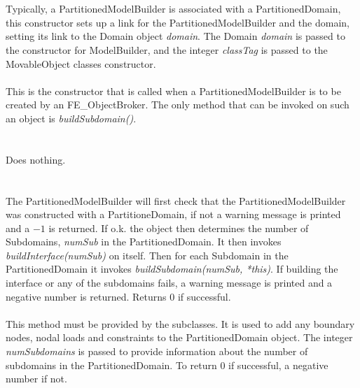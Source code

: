  \\ 
\\  
Typically, a PartitionedModelBuilder is associated with a PartitionedDomain,
this constructor sets up a link for the PartitionedModelBuilder and the domain,
setting its link to the Domain object {\em domain}. The Domain {\em
domain} is passed to the constructor for ModelBuilder, and the integer
{\em classTag} is passed to the MovableObject classes constructor. \\

\\  
This is the constructor that is called when a PartitionedModelBuilder
is to be created by an FE\_ObjectBroker. The only method that can be
invoked on such an object is {\em buildSubdomain()}. \\

 \\
\\ 
Does nothing. \\


 \\
 \\
The PartitionedModelBuilder will first check that the
PartitionedModelBuilder was constructed with a PartitioneDomain, if
not a warning message is printed and a $-1$ is returned. If o.k. the object 
then determines the number of Subdomains, {\em numSub} in the
PartitionedDomain. It then invokes {\em buildInterface(numSub)} on 
itself. Then for each Subdomain in the PartitionedDomain it invokes
{\em buildSubdomain(numSub, *this)}. If building the interface or any
of the subdomains fails, a warning message is printed and a negative
number is returned. Returns $0$ if successful. \\

\\ 
This method must be provided by the subclasses. It is used to add any
boundary nodes, nodal loads and constraints to the PartitionedDomain
object. The integer {\em numSubdomains} is passed to provide
information about the number of subdomains in the
PartitionedDomain. To return $0$ if successful, a negative number if not. \\


